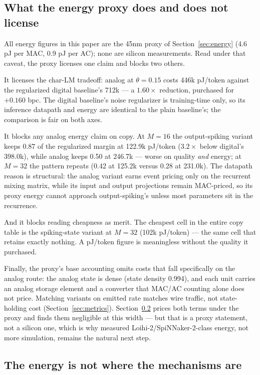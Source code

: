 \subsection{What the energy proxy does and does not license}
\label{sec:hardware-energy}

All energy figures in this paper are the 45nm proxy of Section~\ref{sec:energy} (4.6 pJ per
MAC, 0.9 pJ per AC); none are silicon measurements. Read under that caveat, the proxy
licenses one claim and blocks two others.

It licenses the char-LM tradeoff: analog at $\theta{=}0.15$ costs 446k pJ/token against the
regularized digital baseline's 712k --- a $1.60\times$ reduction, purchased for $+0.160$
bpc. The digital baseline's noise regularizer is training-time only, so its inference
datapath and energy are identical to the plain baseline's; the comparison is fair on both
axes.

It blocks any analog energy claim on copy. At $M{=}16$ the output-spiking variant keeps
0.87 of the regularized margin at 122.9k pJ/token ($3.2\times$ below digital's 398.0k),
while analog keeps 0.50 at 246.7k --- worse on quality \emph{and} energy; at $M{=}32$ the
pattern repeats (0.42 at 125.2k versus 0.28 at 231.0k). The datapath reason is structural:
the analog variant earns event pricing only on the recurrent mixing matrix, while its input
and output projections remain MAC-priced, so its proxy energy cannot approach
output-spiking's unless most parameters sit in the recurrence.

And it blocks reading cheapness as merit. The cheapest cell in the entire copy table is the
spiking-state variant at $M{=}32$ (102k pJ/token) --- the same cell that retains exactly
nothing. A pJ/token figure is meaningless without the quality it purchased.

Finally, the proxy's base accounting omits costs that fall specifically on the analog
route: the analog state is dense (state density 0.994), and each unit carries an analog
storage element and a converter that MAC/AC counting alone does not price. Matching
variants on emitted rate matches wire traffic, not state-holding cost
(Section~\ref{sec:metrics}). Section~\ref{sec:hardware-stranded} prices both terms under
the proxy and finds them negligible at this width --- but that is a proxy statement, not a
silicon one, which is why measured Loihi-2/SpiNNaker-2-class energy, not more simulation,
remains the natural next step.

\subsection{The energy is not where the mechanisms are}
\label{sec:hardware-stranded}

